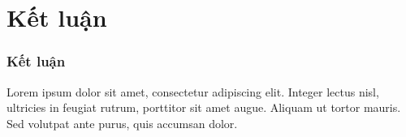 \documentclass{beamer}
\begin{document}
	
	\section{Kết luận}
	
	
	\begin{frame}
		\frametitle{Kết luận}
		Lorem ipsum dolor sit amet, consectetur adipiscing elit. Integer lectus nisl, ultricies in feugiat rutrum, porttitor sit amet augue. Aliquam ut tortor mauris. Sed volutpat ante purus, quis accumsan dolor.
	\end{frame}
	
\end{document}
